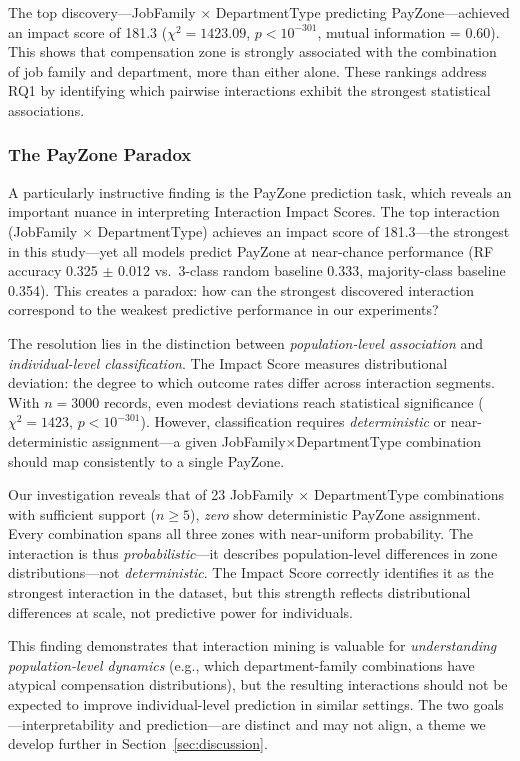 \documentclass[conference]{IEEEtran}
\begin{document}
The top discovery---JobFamily $\times$ DepartmentType predicting PayZone---achieved an impact score of 181.3 ($\chi^2 = 1423.09$, $p < 10^{-301}$, mutual information = 0.60). This shows that compensation zone is strongly associated with the combination of job family and department, more than either alone. These rankings address RQ1 by identifying which pairwise interactions exhibit the strongest statistical associations.

\subsubsection{The PayZone Paradox}

A particularly instructive finding is the PayZone prediction task, which reveals an important nuance in interpreting Interaction Impact Scores. The top interaction (JobFamily $\times$ DepartmentType) achieves an impact score of 181.3---the strongest in this study---yet all models predict PayZone at near-chance performance (RF accuracy 0.325 $\pm$ 0.012 vs.\ 3-class random baseline 0.333, majority-class baseline 0.354). This creates a paradox: how can the strongest discovered interaction correspond to the weakest predictive performance in our experiments?

The resolution lies in the distinction between \textit{population-level association} and \textit{individual-level classification}. The Impact Score measures distributional deviation: the degree to which outcome rates differ across interaction segments. With $n=3000$ records, even modest deviations reach statistical significance ($\chi^2=1423$, $p<10^{-301}$). However, classification requires \textit{deterministic} or near-deterministic assignment---a given JobFamily$\times$DepartmentType combination should map consistently to a single PayZone.

Our investigation reveals that of 23 JobFamily $\times$ DepartmentType combinations with sufficient support ($n \geq 5$), \textit{zero} show deterministic PayZone assignment. Every combination spans all three zones with near-uniform probability. The interaction is thus \textit{probabilistic}---it describes population-level differences in zone distributions---not \textit{deterministic}. The Impact Score correctly identifies it as the strongest interaction in the dataset, but this strength reflects distributional differences at scale, not predictive power for individuals.

This finding demonstrates that interaction mining is valuable for \textit{understanding population-level dynamics} (e.g., which department-family combinations have atypical compensation distributions), but the resulting interactions should not be expected to improve individual-level prediction in similar settings. The two goals---interpretability and prediction---are distinct and may not align, a theme we develop further in Section~\ref{sec:discussion}.
\end{document}
